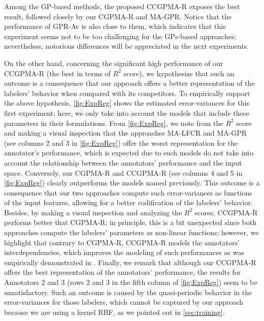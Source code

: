 \documentclass[journal]{IEEEtran}
\begin{document}
Among the GP-based methods, the proposed CCGPMA-R exposes the best result, followed closely by our CGPMA-R and MA-GPR. Notice that the performance of GPR-Av is also close to them, which indicates that this experiment seems not to be too challenging for the GPs-based approaches; nevertheless, notorious differences will be appreciated in the next experiments.

On the other hand, concerning the significant high performance of our CCGPMA-R (the best in terms of $R^2$ score), we hypothesize that such an outcome is a consequence that our approach offers a better representation of the labelers' behavior when compared with its competitors. To empirically support the above hypothesis, \cref{fig:ExpReg} shows the estimated error-variances for this first experiment; here, we only take into account the models that include these parameters in their formulations. From \cref{fig:ExpReg}, we note from the $R^2$ score and making a visual inspection that the approaches MA-LFCR and MA-GPR (see columns 2 and 3 in \cref{fig:ExpReg}) offer the worst representation for the annotator's performance, which is expected due to such models do not take into account the relationship between the annotators' performance and the input space. Conversely, our CGPMA-R and CCGPMA-R (see columns 4 and 5 in \cref{fig:ExpReg}) clearly outperforms the models named previously. This outcome is a consequence that our two approaches compute such error-variances as functions of the input features, allowing for a better codification of the labelers' behavior. Besides, by making a visual inspection and analyzing the $R^2$ scores, CCGPMA-R performs better that CGPMA-R; in principle, this is a bit unexpected since both approaches compute the labelers' parameters as non-linear functions; however, we highlight that contrary to CGPMA-R, CCGPMA-R models the annotators' interdependencies, which improves the modeling of such performances as was empirically demonstrated in \cite{zhu2019unsupervised}. Finally, we remark that although our CCGPMA-R offers the best representation of the annotators' performance, the results for Annotators 2 and 3 (rows 2 and 3 in the fifth column of \cref{fig:ExpReg}) seem to be unsatisfactory. Such an outcome is caused by the quasi-periodic behavior in the error-variances for those labelers, which cannot be captured by our approach because we are using a kernel RBF, as we pointed out in \cref{sec:training}.
\end{document}
